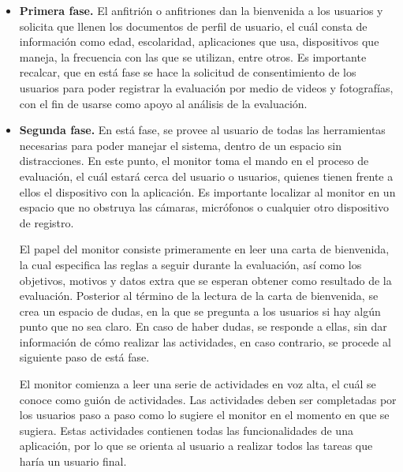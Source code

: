 \begin{itemize}
  \item \textbf{Primera fase.} El anfitrión o anfitriones dan la bienvenida a los usuarios y solicita que llenen los documentos de perfil de usuario, el cuál consta de información como edad, escolaridad, aplicaciones que usa, dispositivos que maneja, la frecuencia con las que se utilizan, entre otros. Es importante recalcar, que en está fase se hace la solicitud de consentimiento de los usuarios para poder registrar la evaluación por medio de videos y fotografías, con el fin de usarse como apoyo al análisis de la evaluación.
  \item \textbf{Segunda fase.} En está fase, se provee al usuario de todas las herramientas necesarias para poder manejar el sistema, dentro de un espacio sin distracciones. En este punto, el monitor toma el mando en el proceso de evaluación, el cuál estará cerca del usuario o usuarios, quienes tienen frente a ellos el dispositivo con la aplicación. Es importante localizar al monitor en un espacio que no obstruya las cámaras, micrófonos o cualquier otro dispositivo de registro.
  
  El papel del monitor consiste primeramente en leer una carta de bienvenida, la cual especifica las reglas a seguir durante la evaluación, así como los objetivos, motivos y datos extra que se esperan obtener como resultado de la evaluación. Posterior al término de la lectura de la carta de bienvenida, se crea un espacio de dudas, en la que se pregunta a los usuarios si hay algún punto que no sea claro. En caso de haber dudas, se responde a ellas, sin dar información de cómo realizar las actividades, en caso contrario, se procede al siguiente paso de está fase.
  
  El monitor comienza a leer una serie de actividades en voz alta, el cuál se conoce como guión de actividades. Las actividades deben ser completadas por los usuarios paso a paso como lo sugiere el monitor en el momento en que se sugiera. Estas actividades contienen todas las funcionalidades de una aplicación, por lo que se orienta al usuario a realizar todos las tareas que haría un usuario final.
  

\end{itemize}
